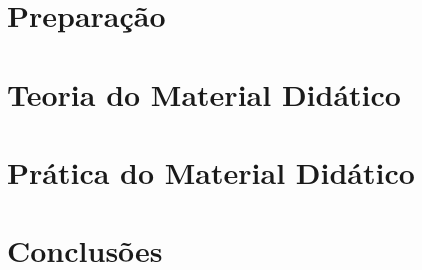 \documentclass[12pt]{book}
\begin{document}
\part{Preparação\label{part:intro}}



\part{Teoria do Material Didático\label{part:teoria}}


\part{Prática do Material Didático\label{part:pratica}}

\part{Conclusões\label{part:conclusões}}

\label{referencias}
    \printbibliography
\end{document}
